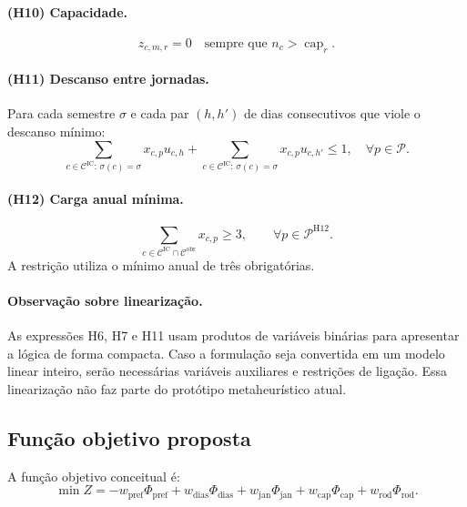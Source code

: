 \paragraph{(H10) Capacidade.}
\begin{equation}
    z_{c,m,r}=0\quad\text{sempre que }n_c>\operatorname{cap}_r.
\end{equation}

\paragraph{(H11) Descanso entre jornadas.} Para cada semestre $\sigma$ e cada par $(h,h')$ de dias consecutivos que viole o descanso mínimo:
\begin{equation}
    \sum_{c\in\mathcal{C}^{\mathrm{IC}}:\,\sigma(c)=\sigma}x_{c,p}u_{c,h}
    +\sum_{c\in\mathcal{C}^{\mathrm{IC}}:\,\sigma(c)=\sigma}x_{c,p}u_{c,h'}\leq1,
    \quad \forall p\in\mathcal{P}.
\end{equation}

\paragraph{(H12) Carga anual mínima.}
\begin{equation}
    \sum_{c\in\mathcal{C}^{\mathrm{IC}}\cap\mathcal{C}^{\mathrm{obr}}}x_{c,p}\geq3,
    \qquad \forall p\in\mathcal{P}^{\mathrm{H12}}.
\end{equation}
A restrição utiliza o mínimo anual de três obrigatórias. 

\paragraph{Observação sobre linearização.} As expressões H6, H7 e H11 usam produtos de variáveis binárias para apresentar a lógica de forma compacta. Caso a formulação seja convertida em um modelo linear inteiro, serão necessárias variáveis auxiliares e restrições de ligação. Essa linearização não faz parte do protótipo metaheurístico atual.

\subsection{Função objetivo proposta}
\label{subsec:funcao_objetivo}

A função objetivo conceitual é:
\begin{equation}
\min Z=-w_{\mathrm{pref}}\Phi_{\mathrm{pref}}
+w_{\mathrm{dias}}\Phi_{\mathrm{dias}}
+w_{\mathrm{jan}}\Phi_{\mathrm{jan}}
+w_{\mathrm{cap}}\Phi_{\mathrm{cap}}
+w_{\mathrm{rod}}\Phi_{\mathrm{rod}}.
\end{equation}

